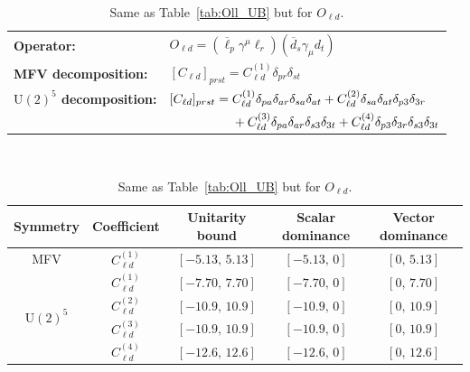 \begin{table}[tbp]
\centering
{\small
\begin{tabular}{ll}
    \textbf{Operator:} &
        $\boxed{O_{\ell d} = (\overline\ell_p \gamma^\mu \ell_r)(\overline d_s \gamma_\mu d_t)}$ \\[0.2cm]
    \textbf{MFV decomposition:} &
        $[C_{\ell d}]_{prst} = C_{\ell d}^{(1)}\delta_{pr}\delta_{st}$ \\[0.15cm]
    \textbf{$\mathrm{U}(2)^5$ decomposition:} &
        $[C_{\ell d}]_{prst} =
            C_{\ell d}^{(1)}\Pij{p}{r}{a}\Pij{s}{t}{a}
            + C_{\ell d}^{(2)}\Pij{s}{t}{a}\delta_{p3}\delta_{3r}$ \\
        & $\phantom{[C_{\ell d}]_{prst} ={}}+ C_{\ell d}^{(3)}\Pij{p}{r}{a}\delta_{s3}\delta_{3t}
            + C_{\ell d}^{(4)}\delta_{p3}\delta_{3r}\delta_{s3}\delta_{3t}$ \\
\end{tabular}
\\[0.3cm]
\renewcommand{\arraystretch}{1.3}
\begin{tabular}{ccccc}
    \toprule
    \rowcolor{hdrcolor}
    \textbf{Symmetry} & \textbf{Coefficient}
        & \textbf{Unitarity bound}
        & \textbf{Scalar dominance}
        & \textbf{Vector dominance} \\
    \midrule
    \multirow{1}{*}{MFV}
        & $C_{\ell d}^{(1)}$ & $[-5.13,\, 5.13]$ & $[-5.13,\, 0]$ & $[0,\, 5.13]$ \\
    \midrule
    \multirow{4}{*}{$\mathrm{U}(2)^5$}
        & $C_{\ell d}^{(1)}$ & $[-7.70,\, 7.70]$ & $[-7.70,\, 0]$ & $[0,\, 7.70]$ \\
        & $C_{\ell d}^{(2)}$ & $[-10.9,\, 10.9]$ & $[-10.9,\, 0]$ & $[0,\, 10.9]$ \\
        & $C_{\ell d}^{(3)}$ & $[-10.9,\, 10.9]$ & $[-10.9,\, 0]$ & $[0,\, 10.9]$ \\
        & $C_{\ell d}^{(4)}$ & $[-12.6,\, 12.6]$ & $[-12.6,\, 0]$ & $[0,\, 12.6]$ \\
    \bottomrule
\end{tabular}}
\caption{Same as Table~\ref{tab:Oll_UB} but for $O_{\ell d}$.}
\label{tab:Old_UB}
\end{table}

